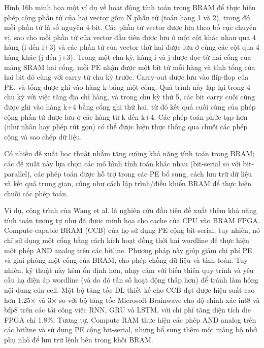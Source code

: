 \documentclass[a4paper]{article}
\begin{document}
Hình 16b minh họa một ví dụ về hoạt động tính toán trong BRAM để thực hiện phép cộng phần tử của hai vector gồm N phần tử (toán hạng 1 và 2), trong đó mỗi phần tử là số nguyên 4-bit. Các phần tử vector được lưu theo bố cục chuyển vị, sao cho mỗi phần tử của vector đầu tiên được lưu ở một cột khác nhau qua 4 hàng (i đến i+3) và các phần tử của vector thứ hai được lưu ở cùng các cột qua 4 hàng khác (j đến j+3). Trong một chu kỳ, hàng i và j được đọc từ hai cổng của mảng SRAM hai cổng, mỗi PE nhận được một bit từ mỗi hàng và tính tổng của hai bit đó cùng với carry từ chu kỳ trước. Carry-out được lưu vào flip-flop của PE, và tổng được ghi vào hàng k bằng một cổng. Quá trình này lặp lại trong 4 chu kỳ với việc tăng địa chỉ hàng, và trong chu kỳ thứ 5, các bit carry cuối cùng được ghi vào hàng k+4 bằng cổng ghi thứ hai, từ đó kết quả cuối cùng của phép cộng phần tử được lưu ở các hàng từ k đến k+4. Các phép toán phức tạp hơn (như nhân hay phép rút gọn) có thể được hiện thực thông qua chuỗi các phép cộng và sao chép dữ liệu.

Có nhiều đề xuất học thuật nhằm tăng cường khả năng tính toán trong BRAM; các đề xuất này lựa chọn các mô hình tính toán khác nhau (bit-serial so với bit-parallel), các phép toán được hỗ trợ trong các PE bổ sung, cách lưu trữ dữ liệu và kết quả trung gian, cũng như cách lập trình/điều khiển BRAM để thực hiện chuỗi các phép toán. 

Ví dụ, công trình của Wang et al. là nghiên cứu đầu tiên đề xuất thêm khả năng tính toán tương tự như đã được minh họa cho cache của CPU vào BRAM FPGA. Compute-capable BRAM (CCB) của họ sử dụng PE cộng bit-serial; tuy nhiên, nó chỉ sử dụng một cổng bằng cách kích hoạt đồng thời hai wordline để thực hiện một phép AND analog trên các bitline. Phương pháp này giúp giảm chi phí PE và giải phóng một cổng của BRAM, cho phép chồng dữ liệu và tính toán. Tuy nhiên, kỹ thuật này kém ổn định hơn, nhạy cảm với biến thiên quy trình và yêu cầu hạ điện áp wordline (và do đó tần số hoạt động thấp hơn) để tránh làm hỏng nội dung của cell. Một bộ tăng tốc DL thiết kế cho CCB đạt được hiệu suất cao hơn 1.25× và 3× so với bộ tăng tốc Microsoft Brainwave cho độ chính xác int8 và bfp8 trên các tải công việc RNN, GRU và LSTM, với chi phí tăng diện tích die FPGA chỉ 1.8\%. Tương tự, Compute RAM thực hiện các phép AND analog trên các bitline và sử dụng PE cộng bit-serial, nhưng bổ sung thêm một mảng bộ nhớ phụ nhỏ để lưu trữ lệnh bên trong khối BRAM.
\end{document}
